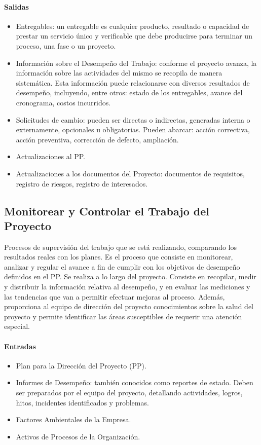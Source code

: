 \documentclass[a4paper,twosides]{article}
\newlength{\wideitemsep}
\let\olditem\item
\renewcommand{\item}{\setlength{\itemsep}{\wideitemsep}\olditem}
\begin{document}
\paragraph{Salidas}
\begin{itemize}
\item Entregables: un entregable es cualquier producto, resultado o capacidad de prestar un servicio único y verificable que debe producirse para terminar un proceso, una fase o un proyecto.
\item Información sobre el Desempeño del Trabajo: conforme el proyecto avanza, la información sobre las actividades del mismo se recopila de manera sistemática. Esta información puede relacionarse con diversos resultados de desempeño, incluyendo, entre otros: estado de los entregables, avance del cronograma, costos incurridos.
\item Solicitudes de cambio: pueden ser directas o indirectas, generadas interna o externamente, opcionales u obligatorias. Pueden abarcar: acción correctiva, acción preventiva, corrección de defecto, ampliación.
\item Actualizaciones al PP.
\item Actualizaciones a los documentos del Proyecto: documentos de requisitos, registro de riesgos, registro de interesados.
\end{itemize}

\subsection{Monitorear y Controlar el Trabajo del Proyecto} \label{sec:controlas_proyecto}
Procesos de supervisión del trabajo que se está realizando, comparando los resultados reales con los planes. Es el proceso que consiste en monitorear, analizar y regular el avance a fin de cumplir con los objetivos de desempeño definidos en el PP. Se realiza a lo largo del proyecto.
Consiste en recopilar, medir y distribuir la información relativa al desempeño, y en evaluar las mediciones y las tendencias que van a permitir efectuar mejoras al proceso. Además, proporciona al equipo de dirección del proyecto conocimientos sobre la salud del proyecto y permite identificar las áreas susceptibles de requerir una atención especial.
\paragraph{Entradas}
\begin{itemize}
\item Plan para la Dirección del Proyecto (PP).
\item Informes de Desempeño: también conocidos como reportes de estado. Deben ser preparados por el equipo del proyecto, detallando actividades, logros, hitos, incidentes identificados y problemas.
\item Factores Ambientales de la Empresa.
\item Activos de Procesos de la Organización.
\end{itemize}
\end{document}
